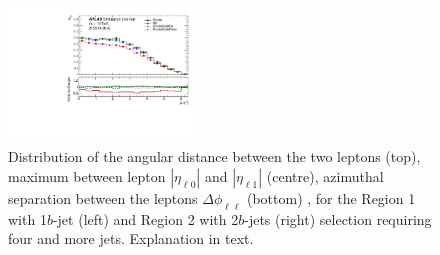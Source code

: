 \begin{figure}[!htb]
\includegraphics[width=0.45\textwidth]{Plots/ttV/generator/c_Region_1_lep_dPhi} 
  \caption{Distribution of the angular distance between the two leptons (top), maximum between lepton $|\eta_{\ell 0}|$ and $|\eta_{\ell 1}|$ (centre), azimuthal separation between the leptons $\Delta \phi _{\ell \ell }$ (bottom) , for the Region 1 with 1$b$-jet (left) and Region 2 with 2$b$-jets (right) selection requiring four and more jets. Explanation in text.
   \label{ttV:den_ll_kin}}
\end{figure}
% 



